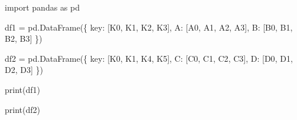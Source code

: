 \documentclass[
  polish,
  letterpaper,
  DIV=11,
  numbers=noendperiod]{scrreprt}
\newenvironment{Shaded}{\begin{snugshade}}{\end{snugshade}}
\newcommand{\BuiltInTok}[1]{\textcolor[rgb]{0.00,0.23,0.31}{#1}}
\newcommand{\ImportTok}[1]{\textcolor[rgb]{0.00,0.46,0.62}{#1}}
\newcommand{\NormalTok}[1]{\textcolor[rgb]{0.00,0.23,0.31}{#1}}
\newcommand{\OperatorTok}[1]{\textcolor[rgb]{0.37,0.37,0.37}{#1}}
\newcommand{\StringTok}[1]{\textcolor[rgb]{0.13,0.47,0.30}{#1}}
\begin{document}
\begin{Shaded}
\begin{Highlighting}[]
\ImportTok{import}\NormalTok{ pandas }\ImportTok{as}\NormalTok{ pd}

\NormalTok{df1 }\OperatorTok{=}\NormalTok{ pd.DataFrame(\{}
    \StringTok{\textquotesingle{}key\textquotesingle{}}\NormalTok{: [}\StringTok{\textquotesingle{}K0\textquotesingle{}}\NormalTok{, }\StringTok{\textquotesingle{}K1\textquotesingle{}}\NormalTok{, }\StringTok{\textquotesingle{}K2\textquotesingle{}}\NormalTok{, }\StringTok{\textquotesingle{}K3\textquotesingle{}}\NormalTok{],}
    \StringTok{\textquotesingle{}A\textquotesingle{}}\NormalTok{: [}\StringTok{\textquotesingle{}A0\textquotesingle{}}\NormalTok{, }\StringTok{\textquotesingle{}A1\textquotesingle{}}\NormalTok{, }\StringTok{\textquotesingle{}A2\textquotesingle{}}\NormalTok{, }\StringTok{\textquotesingle{}A3\textquotesingle{}}\NormalTok{],}
    \StringTok{\textquotesingle{}B\textquotesingle{}}\NormalTok{: [}\StringTok{\textquotesingle{}B0\textquotesingle{}}\NormalTok{, }\StringTok{\textquotesingle{}B1\textquotesingle{}}\NormalTok{, }\StringTok{\textquotesingle{}B2\textquotesingle{}}\NormalTok{, }\StringTok{\textquotesingle{}B3\textquotesingle{}}\NormalTok{]}
\NormalTok{\})}

\NormalTok{df2 }\OperatorTok{=}\NormalTok{ pd.DataFrame(\{}
    \StringTok{\textquotesingle{}key\textquotesingle{}}\NormalTok{: [}\StringTok{\textquotesingle{}K0\textquotesingle{}}\NormalTok{, }\StringTok{\textquotesingle{}K1\textquotesingle{}}\NormalTok{, }\StringTok{\textquotesingle{}K4\textquotesingle{}}\NormalTok{, }\StringTok{\textquotesingle{}K5\textquotesingle{}}\NormalTok{],}
    \StringTok{\textquotesingle{}C\textquotesingle{}}\NormalTok{: [}\StringTok{\textquotesingle{}C0\textquotesingle{}}\NormalTok{, }\StringTok{\textquotesingle{}C1\textquotesingle{}}\NormalTok{, }\StringTok{\textquotesingle{}C2\textquotesingle{}}\NormalTok{, }\StringTok{\textquotesingle{}C3\textquotesingle{}}\NormalTok{],}
    \StringTok{\textquotesingle{}D\textquotesingle{}}\NormalTok{: [}\StringTok{\textquotesingle{}D0\textquotesingle{}}\NormalTok{, }\StringTok{\textquotesingle{}D1\textquotesingle{}}\NormalTok{, }\StringTok{\textquotesingle{}D2\textquotesingle{}}\NormalTok{, }\StringTok{\textquotesingle{}D3\textquotesingle{}}\NormalTok{]}
\NormalTok{\})}

\BuiltInTok{print}\NormalTok{(df1)}

\BuiltInTok{print}\NormalTok{(df2)}


\end{Highlighting}
\end{Shaded}
\end{document}
